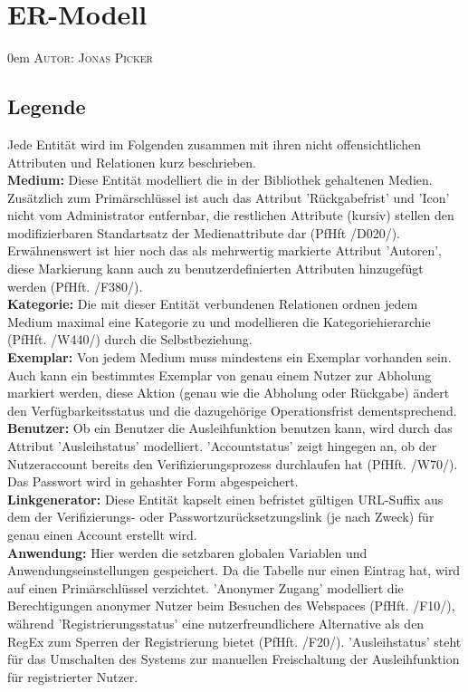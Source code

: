 \documentclass{article}
\makeatletter
\newcommand{\sectionauthor}[1]{
	{\parindent 0em \large \scshape Autor: #1 \par \nobreak \vspace*{1em}}
	\@afterheading
}
\makeatother
\begin{document}
\section{ER-Modell}
\sectionauthor{Jonas Picker}

\subsection{Legende}
Jede Entität wird im Folgenden zusammen mit ihren nicht offensichtlichen Attributen und Relationen kurz beschrieben.\\
\textbf{Medium:} Diese Entität modelliert die in der Bibliothek gehaltenen Medien. Zusätzlich zum Primärschlüssel ist auch das Attribut 'Rückgabefrist' und 'Icon' nicht vom Administrator entfernbar, die restlichen Attribute (kursiv) stellen den modifizierbaren Standartsatz der Medienattribute dar (PfHft /D020/). Erwähnenswert ist hier noch das als mehrwertig markierte Attribut 'Autoren', diese Markierung kann auch zu benutzerdefinierten Attributen hinzugefügt werden (PfHft. /F380/).\\
\textbf{Kategorie:} Die mit dieser Entität verbundenen Relationen ordnen jedem Medium maximal eine Kategorie zu und modellieren die Kategoriehierarchie (PfHft. /W440/) durch die Selbstbeziehung.\\
\textbf{Exemplar:} Von jedem Medium muss mindestens ein Exemplar vorhanden sein. Auch kann ein bestimmtes Exemplar von genau einem Nutzer zur Abholung markiert werden, diese Aktion (genau wie die Abholung oder Rückgabe) ändert den Verfügbarkeitsstatus und die dazugehörige Operationsfrist dementsprechend. \\
\textbf{Benutzer:} Ob ein Benutzer die Ausleihfunktion benutzen kann, wird durch das Attribut 'Ausleihstatus' modelliert. 'Accountstatus' zeigt hingegen an, ob der Nutzeraccount bereits den Verifizierungsprozess durchlaufen hat (PfHft. /W70/). Das Passwort wird in gehashter Form abgespeichert. \\
\textbf{Linkgenerator:} Diese Entität kapselt einen befristet gültigen URL-Suffix aus dem der Verifizierungs- oder Passwortzurücksetzungslink (je nach Zweck) für genau einen Account erstellt wird.\\
\textbf{Anwendung:} Hier werden die setzbaren globalen Variablen und Anwendungseinstellungen gespeichert. Da die Tabelle nur einen Eintrag hat, wird auf einen Primärschlüssel verzichtet. 'Anonymer Zugang' modelliert die Berechtigungen anonymer Nutzer beim Besuchen des Webspaces (PfHft. /F10/), während 'Registrierungsstatus' eine nutzerfreundlichere Alternative als den RegEx zum Sperren der Registrierung bietet (PfHft. /F20/). 'Ausleihstatus' steht für das Umschalten des Systems zur manuellen Freischaltung der Ausleihfunktion für registrierter Nutzer. \\
\end{document}
